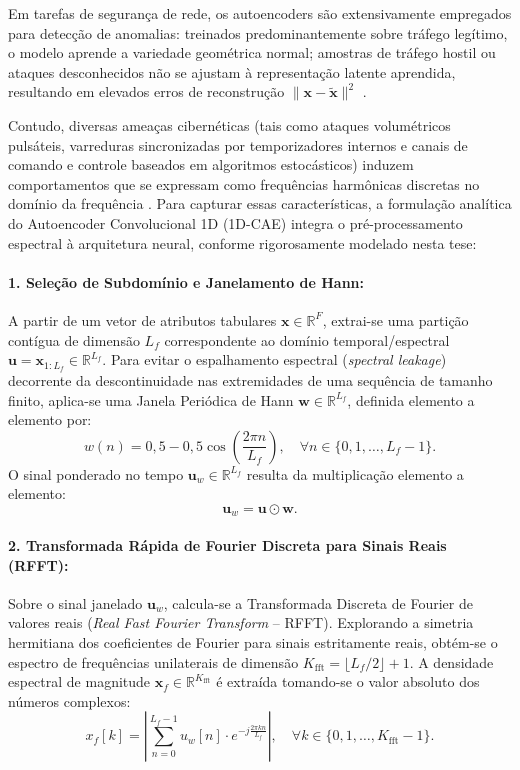 Em tarefas de segurança de rede, os autoencoders são extensivamente empregados para detecção de anomalias: treinados predominantemente sobre tráfego legítimo, o modelo aprende a variedade geométrica normal; amostras de tráfego hostil ou ataques desconhecidos não se ajustam à representação latente aprendida, resultando em elevados erros de reconstrução $\|\mathbf{x} - \tilde{\mathbf{x}}\|^2$ \cite{hsae2025, borgioli2024cae}.

Contudo, diversas ameaças cibernéticas (tais como ataques volumétricos pulsáteis, varreduras sincronizadas por temporizadores internos e canais de comando e controle baseados em algoritmos estocásticos) induzem comportamentos que se expressam como frequências harmônicas discretas no domínio da frequência \cite{ugr162021}. Para capturar essas características, a formulação analítica do Autoencoder Convolucional 1D (1D-CAE) integra o pré-processamento espectral à arquitetura neural, conforme rigorosamente modelado nesta tese:

\paragraph{1. Seleção de Subdomínio e Janelamento de Hann:}
A partir de um vetor de atributos tabulares $\mathbf{x} \in \mathbb{R}^F$, extrai-se uma partição contígua de dimensão $L_f$ correspondente ao domínio temporal/espectral $\mathbf{u} = \mathbf{x}_{1:L_f} \in \mathbb{R}^{L_f}$. Para evitar o espalhamento espectral (\emph{spectral leakage}) decorrente da descontinuidade nas extremidades de uma sequência de tamanho finito, aplica-se uma Janela Periódica de Hann $\mathbf{w} \in \mathbb{R}^{L_f}$, definida elemento a elemento por:
\begin{equation}
\label{eq:hann_window}
w(n) = 0{,}5 - 0{,}5 \cos \left( \frac{2\pi n}{L_f} \right), \quad \forall n \in \{0, 1, \dots, L_f - 1\}.
\end{equation}
O sinal ponderado no tempo $\mathbf{u}_w \in \mathbb{R}^{L_f}$ resulta da multiplicação elemento a elemento:
\begin{equation}
\label{eq:hann_application}
\mathbf{u}_w = \mathbf{u} \odot \mathbf{w}.
\end{equation}

\paragraph{2. Transformada Rápida de Fourier Discreta para Sinais Reais (RFFT):}
Sobre o sinal janelado $\mathbf{u}_w$, calcula-se a Transformada Discreta de Fourier de valores reais (\emph{Real Fast Fourier Transform} -- RFFT). Explorando a simetria hermitiana dos coeficientes de Fourier para sinais estritamente reais, obtém-se o espectro de frequências unilaterais de dimensão $K_{\mathrm{fft}} = \lfloor L_f / 2 \rfloor + 1$. A densidade espectral de magnitude $\mathbf{x}_f \in \mathbb{R}^{K_{\mathrm{fft}}}$ é extraída tomando-se o valor absoluto dos números complexos:
\begin{equation}
\label{eq:rfft_magnitude}
x_f[k] = \left| \sum_{n=0}^{L_f - 1} u_w[n] \cdot e^{-j \frac{2\pi k n}{L_f}} \right|, \quad \forall k \in \{0, 1, \dots, K_{\mathrm{fft}} - 1\}.
\end{equation}

